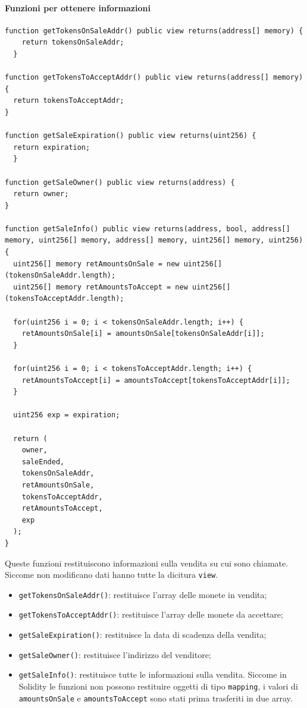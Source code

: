 \documentclass[a4paper]{article}
\begin{document}
        \paragraph{Funzioni per ottenere informazioni}
\begin{lstlisting}[style=ES6, title={Funzioni per ottenere informazioni}]
function getTokensOnSaleAddr() public view returns(address[] memory) {
    return tokensOnSaleAddr;
  }

function getTokensToAcceptAddr() public view returns(address[] memory) {
  return tokensToAcceptAddr;
}

function getSaleExpiration() public view returns(uint256) {
  return expiration;
  }

function getSaleOwner() public view returns(address) {
  return owner;
}

function getSaleInfo() public view returns(address, bool, address[] memory, uint256[] memory, address[] memory, uint256[] memory, uint256) {
  uint256[] memory retAmountsOnSale = new uint256[](tokensOnSaleAddr.length);
  uint256[] memory retAmountsToAccept = new uint256[](tokensToAcceptAddr.length);

  for(uint256 i = 0; i < tokensOnSaleAddr.length; i++) {
    retAmountsOnSale[i] = amountsOnSale[tokensOnSaleAddr[i]];
  }

  for(uint256 i = 0; i < tokensToAcceptAddr.length; i++) {
    retAmountsToAccept[i] = amountsToAccept[tokensToAcceptAddr[i]];
  }

  uint256 exp = expiration;

  return (
    owner,
    saleEnded,
    tokensOnSaleAddr,
    retAmountsOnSale,
    tokensToAcceptAddr,
    retAmountsToAccept,
    exp
  );
}\end{lstlisting}
        Queste funzioni restituiscono informazioni sulla vendita su cui sono chiamate. Siccome non modificano dati hanno tutte la dicitura \verb|view|.
        \begin{itemize}
          \item \verb|getTokensOnSaleAddr()|: restituisce l'array delle monete in vendita;
          \item \verb|getTokensToAcceptAddr()|: restituisce l'array delle monete da accettare;
          \item \verb|getSaleExpiration()|: restituisce la data di scadenza della vendita;
          \item \verb|getSaleOwner()|: restituisce l'indirizzo del venditore;
          \item \verb|getSaleInfo()|: restituisce tutte le informazioni sulla vendita. Siccome in Solidity le funzioni non possono restituire oggetti di tipo \verb|mapping|, i valori di \verb|amountsOnSale| e \verb|amountsToAccept| sono stati prima trasferiti in due array.
        \end{itemize}
\end{document}
